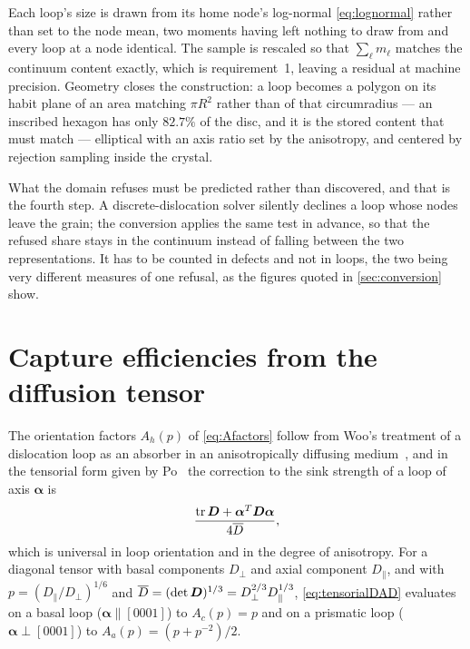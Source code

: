Each loop's size is drawn from its home node's log-normal
\cref{eq:lognormal} rather than set to the node mean, two moments having left
nothing to draw from and every loop at a node identical. The sample is rescaled
so that $\sum_\ell m_\ell$ matches the continuum content exactly, which is
requirement~1, leaving a residual at machine precision. Geometry closes the
construction: a loop becomes a polygon on its habit plane of an area matching
$\pi R^{2}$ rather than of that circumradius --- an inscribed hexagon has only
$82.7\%$ of the disc, and it is the stored content that must match ---
elliptical with an axis ratio set by the anisotropy, and centered by rejection
sampling inside the crystal.

What the domain refuses must be predicted rather than discovered, and that is
the fourth step. A discrete-dislocation solver silently declines a loop whose
nodes leave the grain; the conversion applies the same test in advance, so that
the refused share stays in the continuum instead of falling between the two
representations. It has to be counted in defects and not in loops, the two
being very different measures of one refusal, as the figures quoted in
\cref{sec:conversion} show.




\FloatBarrier

\section{Capture efficiencies from the diffusion tensor}
\label{app:woo}

The orientation factors $A_{h}(p)$ of \cref{eq:Afactors} follow from Woo's
treatment of a dislocation loop as an absorber in an anisotropically diffusing
medium~\citep{woo1981sink,woo1982intrinsic,woo1988theory}, and in the tensorial
form given by Po~\citep{po2026tensorialdad} the correction to the sink strength of a loop
of axis $\bm\alpha$ is
\begin{equation}
  \frac{\operatorname{tr}\bm{D}+\bm\alpha^{T}\bm{D}\bm\alpha}{4\overline D},
  \label{eq:tensorialDAD}
\end{equation}
which is universal in loop orientation and in the degree of anisotropy. For a
diagonal tensor with basal components $D_\perp$ and axial component
$D_\parallel$, and with $p=(D_\parallel/D_\perp)^{1/6}$ and
$\overline D=(\det\bm{D})^{1/3}=D_\perp^{2/3}D_\parallel^{1/3}$,
\cref{eq:tensorialDAD} evaluates on a basal loop ($\bm\alpha\parallel[0001]$) to
$A_c(p)=p$ and on a prismatic loop ($\bm\alpha\perp[0001]$) to
$A_a(p)=(p+p^{-2})/2$.

